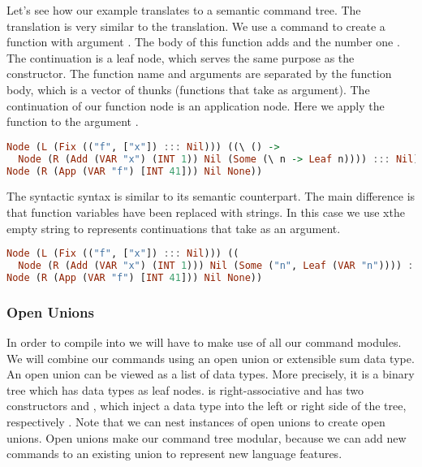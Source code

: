 Let's see how our example  translates to a semantic command tree. The translation is very similar to the  translation. We use a  command to create a function  with argument . The body of this function adds  and the number one . The continuation is a leaf node, which serves the same purpose as the  constructor. The function name and arguments are separated by the function body, which is a vector of thunks (functions that take \icode{()} as argument). The continuation of our function node is an application node. Here we apply the function  to the argument .
  
\begin{lstlisting}[language=Haskell]
Node (L (Fix (("f", ["x"]) ::: Nil))) ((\ () ->
  Node (R (Add (VAR "x") (INT 1)) Nil (Some (\ n -> Leaf n)))) ::: Nil) (Some (\ () ->
Node (R (App (VAR "f") [INT 41])) Nil None))
\end{lstlisting}

The syntactic syntax is similar to its semantic counterpart. The main difference is that function variables have been replaced with strings. In this case we use xthe empty string  to represents continuations that take \icode{()} as an argument.

\begin{lstlisting}[language=Haskell]
Node (L (Fix (("f", ["x"]) ::: Nil))) ((
  Node (R (Add (VAR "x") (INT 1))) Nil (Some ("n", Leaf (VAR "n")))) ::: Nil) (Some ("",
Node (R (App (VAR "f") [INT 41])) Nil None))
\end{lstlisting}

\subsubsection{\label{subsection:openunion}Open Unions}
In order to compile  into  we will have to make use of all our command modules. We will combine our commands using an open union or extensible sum data type. An open union can be viewed as a list of data types. More precisely, it is a binary tree which has data types as leaf nodes. \icode{:+:} is right-associative and has two constructors  and , which inject a data type into the left or right side of the tree, respectively \autocite{DBLP:conf/popl/LiangHJ95}. Note that we can nest instances of open unions to create open unions. Open unions make our command tree modular, because we can add new commands to an existing union to represent new language features.

